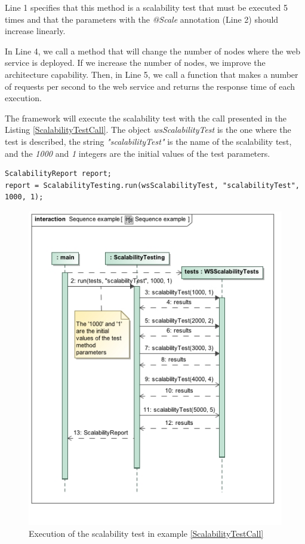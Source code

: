 Line 1 specifies that this method is a scalability test that must be executed 5 times and that the parameters with the \emph{@Scale} annotation (Line 2) should increase linearly. 

In Line 4, we call a method that will change the number of nodes where the web service is deployed. If we increase the number of nodes, we improve the architecture capability. Then, in Line 5, we call a function that makes a number of requests per second to the web service and returns the response time of each execution.

The framework will execute the scalability test with the call presented in the Listing \ref{ScalabilityTestCall}. The object \emph{wsScalabilityTest} is the one where the test is described, the string \emph{"scalabilityTest"} is the name of the scalability test, and the \emph{1000} and \emph{1}  integers are the initial values of the test parameters.
\begin{lstlisting}
ScalabilityReport report;
report = ScalabilityTesting.run(wsScalabilityTest, "scalabilityTest", 1000, 1);
\end{lstlisting}


\begin{figure}[h]
\begin{center}
	\includegraphics[scale=0.7]{images/sequenceExample.jpg}
\caption{Execution of the scalability test in example \ref{ScalabilityTestCall}}
\label{sequenceDiagramExample}
\end{center}
\end{figure}

